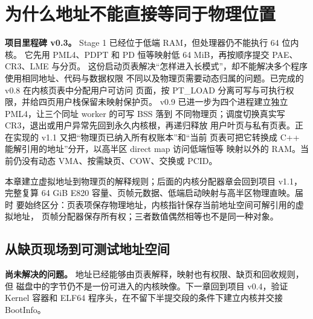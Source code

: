 \chapter{为什么地址不能直接等同于物理位置}

\begin{statebox}
\textbf{项目里程碑 v0.3。} Stage 1 已经位于低端 RAM，但处理器仍不能执行 64 位内核。
它先用 PML4、PDPT 和 PD 恒等映射低 64 MiB，再按顺序提交 PAE、CR3、LME 与分页。
这份启动页表解决“怎样进入长模式”，却不能解决多个程序使用相同地址、代码与数据权限
不同以及物理页需要动态归属的问题。已完成的 v0.8 在内核页表中分配用户可访问
页面，按 PT\_LOAD 分离可写与可执行权限，并给四页用户栈保留未映射保护页。
v0.9 已进一步为四个进程建立独立 PML4，让三个同址 worker 的可写 BSS 落到
不同物理页；调度切换真实写 CR3，退出或用户异常先回到永久内核根，再递归释放
用户叶页与私有页表。正在实现的 v1.1 又把“物理页已纳入所有权账本”和“当前
页表可把它转换成 C++ 能解引用的地址”分开，以高半区 direct map 访问低端恒等
映射以外的 RAM。当前仍没有动态 VMA、按需缺页、COW、交换或 PCID。
\end{statebox}




\begin{keyidea}
本章建立虚拟地址到物理页的解释规则；后面的内核分配器章会回到项目 v1.1，
完整复算 64 GiB E820 容量、页帧元数据、低端启动映射与高半区物理直映。届时
要始终区分：页表项保存物理地址，内核指针保存当前地址空间可解引用的虚拟地址，
页帧分配器保存所有权；三者数值偶然相等也不是同一种对象。
\end{keyidea}

\section{从缺页现场到可测试地址空间}

\begin{problemframe}
\textbf{尚未解决的问题。} 地址已经能够由页表解释，映射也有权限、缺页和回收规则，但
磁盘中的字节仍不是一份可进入的内核映像。下一章回到项目 v0.4，验证 Kernel 容器和
ELF64 程序头，在不留下半提交段的条件下建立内核并交接 BootInfo。
\end{problemframe}
